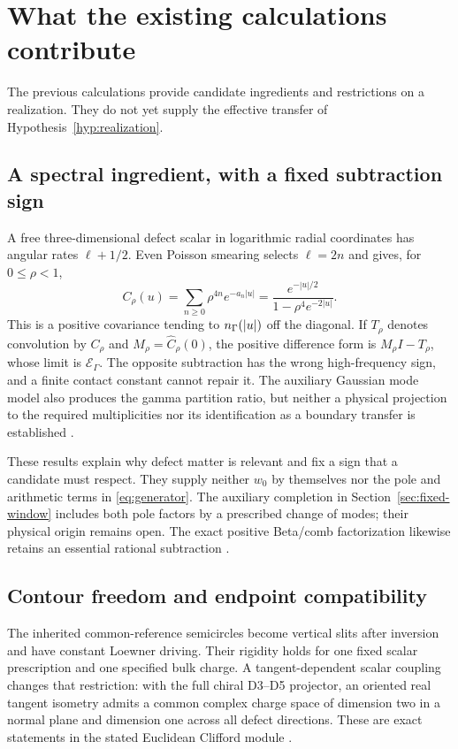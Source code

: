 \section{What the existing calculations contribute}\label{sec:constraints}

The previous calculations provide candidate ingredients and
restrictions on a realization. They do not yet supply the effective
transfer of Hypothesis~\ref{hyp:realization}.

\subsection{A spectral ingredient, with a fixed subtraction sign}

A free three-dimensional defect scalar in logarithmic radial
coordinates has angular rates $\ell+1/2$. Even Poisson smearing
selects $\ell=2n$ and gives, for $0\leq\rho<1$,
\begin{equation}
 C_\rho(u)=\sum_{n\geq0}\rho^{4n}e^{-a_n|u|}
       =\frac{e^{-|u|/2}}{1-\rho^4e^{-2|u|}}.
\end{equation}
This is a positive covariance tending to $n_\Gamma(|u|)$ off the
diagonal. If $T_\rho$ denotes convolution by $C_\rho$ and
$M_\rho=\widehat C_\rho(0)$, the positive difference form is
$M_\rho I-T_\rho$, whose limit is $\mathcal E_\Gamma$.
The opposite subtraction has the wrong high-frequency sign, and
a finite contact constant cannot repair it. The auxiliary Gaussian
mode model also produces the gamma partition ratio, but neither
a physical projection to the required multiplicities nor its
identification as a boundary transfer is established
\cite[Section~S2]{Supplement}.

These results explain why defect matter is relevant and fix a
sign that a candidate must respect. They supply neither $w_0$
by themselves nor the pole and arithmetic terms in
\eqref{eq:generator}. The auxiliary completion in
Section~\ref{sec:fixed-window} includes both pole factors by a
prescribed change of modes; their physical origin remains open. The exact positive Beta/comb factorization
likewise retains an essential rational subtraction
\cite[Section~S1.4]{Supplement}.

\subsection{Contour freedom and endpoint compatibility}

The inherited common-reference semicircles become vertical slits
after inversion and have constant Loewner driving. Their rigidity
holds for one fixed scalar prescription and one specified bulk
charge. A tangent-dependent scalar coupling changes that
restriction: with the full chiral D3--D5 projector, an oriented
real tangent isometry admits a common complex charge space of
dimension two in a normal plane and dimension one across all
defect directions. These are exact statements in the stated
Euclidean Clifford module
\cite[Sections~S3 and S5]{Supplement}.

